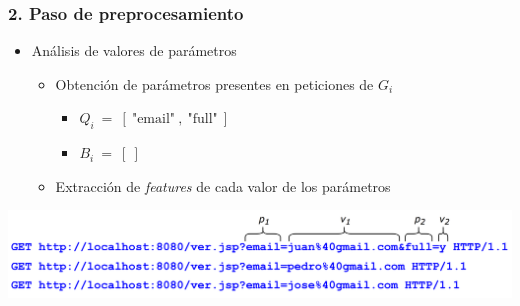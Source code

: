 \begin{frame}
    \frametitle{2. Paso de preprocesamiento}

    \begin{itemize}[<+->]
        \item
        Análisis de valores de parámetros

        \begin{itemize}[<.->]
            \item
            Obtención de parámetros presentes en peticiones de $G_{i}$

            \begin{itemize}
                \item
                $ Q_{i} \ = \ [ \ \text{"email"} \ , \ \text{"full"} \ ] $

                \item
                $ B_{i} \ = \ [ \ ] $
            \end{itemize}

            \item
            Extracción de \textit{features} de cada valor de los parámetros
        \end{itemize}
    \end{itemize}

    \begin{flushleft}
        \includegraphics[width=\textwidth]{images/request-examples-1.png}
    \end{flushleft}
\end{frame}


